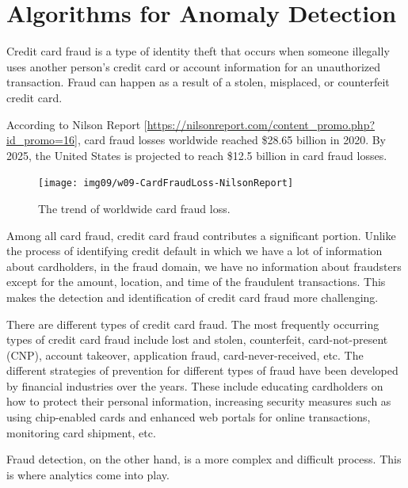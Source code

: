 \documentclass[
]{book}
\begin{document}
\hfill\break

\hypertarget{algorithms-for-anomaly-detection}{%
\chapter{Algorithms for Anomaly Detection}\label{algorithms-for-anomaly-detection}}

Credit card fraud is a type of identity theft that occurs when someone illegally uses another person's credit card or account information for an unauthorized transaction. Fraud can happen as a result of a stolen, misplaced, or counterfeit credit card.

According to Nilson Report {[}\url{https://nilsonreport.com/content_promo.php?id_promo=16}{]}, card fraud losses worldwide reached \$28.65 billion in 2020. By 2025, the United States is projected to reach \$12.5 billion in card fraud losses.

\begin{figure}

{\centering \texttt{[image: img09/w09-CardFraudLoss-NilsonReport]} 

}

\caption{The trend of worldwide card fraud loss.}\label{fig:unnamed-chunk-236}
\end{figure}

Among all card fraud, credit card fraud contributes a significant portion. Unlike the process of identifying credit default in which we have a lot of information about cardholders, in the fraud domain, we have no information about fraudsters except for the amount, location, and time of the fraudulent transactions. This makes the detection and identification of credit card fraud more challenging.

There are different types of credit card fraud. The most frequently occurring types of credit card fraud include lost and stolen, counterfeit, card-not-present (CNP), account takeover, application fraud, card-never-received, etc. The different strategies of prevention for different types of fraud have been developed by financial industries over the years. These include educating cardholders on how to protect their personal information, increasing security measures such as using chip-enabled cards and enhanced web portals for online transactions, monitoring card shipment, etc.

Fraud detection, on the other hand, is a more complex and difficult process. This is where analytics come into play.
\end{document}
